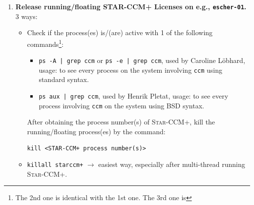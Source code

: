 \documentclass[onsided]{book}
\numberwithin{equation}{section}
\newtheorem{remark}{Remark}[section]
\begin{document}
\begin{enumerate}
\begin{itemize}
        \begin{remark}
            Before running on the notebook \texttt{nguyen@fg8nb1}, especially after rebooting, I need to run
            \begin{verbatim}
nguyen@fg8nb1:~$ flexlm
            \end{verbatim}
            1st to activate the license manager in order to provide a license(s) to run \textsc{Star-CCM+}.
        \end{remark}
        \item Compute server \texttt{escher-01}\footnote{I have also the access to the compute servers \texttt{escher-03, escher-04, leonhard-01}, but none of them has \textsc{Star-CCM+} installed.}: Installed versions and their installation directories:
        \begin{itemize}
            \item \texttt{11.06.011-R8}:  \verb|/opt/CD-adapco/11.06.011-R8/STAR-CCM+11.06.011-R8/star/bin/starccm+|
            \item \texttt{13.04.010-R8}: \verb|/opt/CD-adapco/13.04.010-R8/STAR-CCM+13.04.010-R8/star/bin/starccm+|
        \end{itemize}
    \end{itemize}
    \item \textbf{Release running/floating STAR-CCM+ Licenses on e.g., \texttt{escher-01}.} 3 ways:
    \begin{itemize}
        \item Check if the process(es) is/(are) active with 1 of the following commands\footnote{ The 2nd one is identical with the 1st one. The 3rd one is  }:
        \begin{itemize}
            \item \texttt{ps -A | grep ccm} or \texttt{ps -e | grep ccm}, used by Caroline L\"obhard, usage: to see every process on the system involving \texttt{ccm} using standard syntax.
            \item \texttt{ps aux | grep ccm}, used by Henrik Pletat, usage: to see every process involving \texttt{ccm} on the system using BSD syntax.
        \end{itemize}
        After obtaining the process number(s) of \textsc{Star-CCM+}, kill the running/floating process(es) by the command:
        \begin{verbatim}
kill <STAR-CCM+ process number(s)>
        \end{verbatim}
        \item \texttt{killall starccm+} $\to$ easiest way, especially after multi-thread running \textsc{Star-CCM+}.

\end{itemize}
\end{enumerate}
\end{document}
